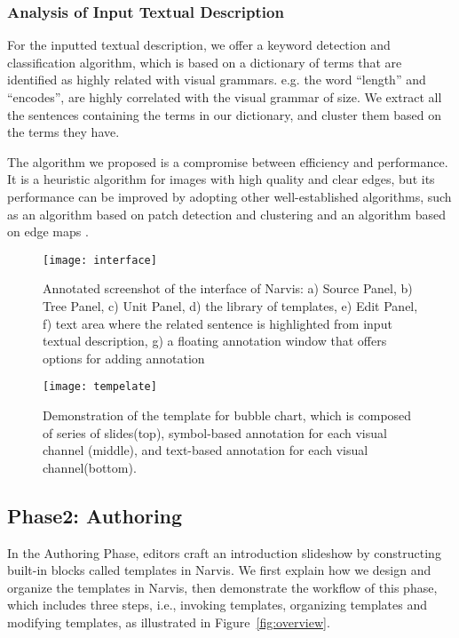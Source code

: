 \subsubsection{Analysis of Input Textual Description}
For the inputted textual description, we offer a keyword detection and classification algorithm, which is based on a dictionary of terms that are identified as highly related with visual grammars. e.g. the word ``length'' and ``encodes'', are highly correlated with the  visual grammar of size. We extract all the sentences containing the terms in our dictionary, and cluster them based on the terms they have.

The algorithm we proposed is a compromise between efficiency and performance. It is a heuristic algorithm for images with high quality and clear edges, but its performance can be improved by adopting other well-established algorithms, such as an algorithm based on patch detection and clustering \cite{savva_revision:_2011} and an algorithm based on edge maps \cite{huang2003model}.


    
    
\begin{figure}
 \centering %
 \texttt{[image: interface]}
 \caption{Annotated screenshot of the interface of Narvis: a) Source Panel, b) Tree Panel, c) Unit Panel, d) the library of templates, e) Edit Panel, f) text area where the related sentence is highlighted from input textual description, g) a floating annotation window that offers options for adding annotation}
 \label{fig:interface}
\end{figure}


\begin{figure}
 \centering 
 \texttt{[image: tempelate]}
 \caption{Demonstration of the template for bubble chart, which is composed of series of slides(top), symbol-based annotation for each visual channel (middle), and text-based annotation for each visual channel(bottom). }
 \label{fig:template}
\end{figure}


\subsection{Phase2: Authoring}
In the Authoring Phase, editors craft an introduction slideshow by constructing built-in blocks called templates in Narvis. We first explain how we design and organize the templates in Narvis, then demonstrate the workflow of this phase, which includes three steps, i.e., invoking templates, organizing templates and modifying templates, as illustrated in Figure~\ref{fig:overview}. 

